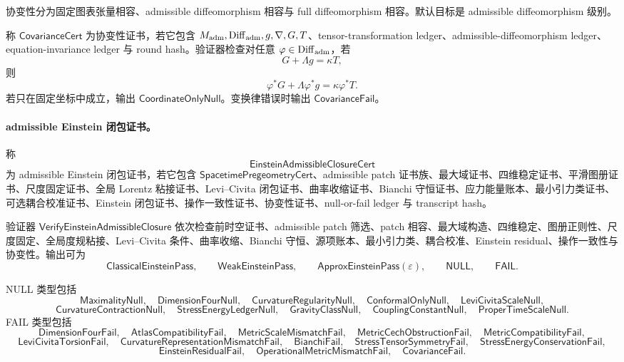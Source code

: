协变性分为固定图表张量相容、admissible diffeomorphism 相容与 full diffeomorphism 相容。默认目标是 admissible diffeomorphism 级别。

\begin{definition}[协变性证书]\label{def:typed-address-biaxial-completion-covariance-cert}
称 \(\mathsf{CovarianceCert}\) 为协变性证书，若它包含 \(M_{\mathrm{adm}},\mathrm{Diff}_{\rm adm},g,\nabla,G,T\)、tensor-transformation ledger、admissible-diffeomorphism ledger、equation-invariance ledger 与 round hash。验证器检查对任意 \(\varphi\in\mathrm{Diff}_{\rm adm}\)，若
\[
G+\Lambda g=\kappa T,
\]
则
\[
\varphi^*G+\Lambda\varphi^*g=\kappa\varphi^*T.
\]
若只在固定坐标中成立，输出 \(\mathsf{CoordinateOnlyNull}\)。变换律错误时输出 \(\mathsf{CovarianceFail}\)。
\end{definition}

\paragraph{admissible Einstein 闭包证书。}
\begin{definition}\label{def:typed-address-biaxial-completion-einstein-admissible-closure-cert}
称
\[
\mathsf{EinsteinAdmissibleClosureCert}
\]
为 admissible Einstein 闭包证书，若它包含 \(\mathsf{SpacetimePregeometryCert}\)、admissible patch 证书族、最大域证书、四维稳定证书、平滑图册证书、尺度固定证书、全局 Lorentz 粘接证书、Levi--Civita 闭包证书、曲率收缩证书、Bianchi 守恒证书、应力能量账本、最小引力类证书、可选耦合校准证书、Einstein 闭包证书、操作一致性证书、协变性证书、null-or-fail ledger 与 transcript hash。
\end{definition}

验证器 \(\mathsf{VerifyEinsteinAdmissibleClosure}\) 依次检查前时空证书、admissible patch 筛选、patch 相容、最大域构造、四维稳定、图册正则性、尺度固定、全局度规粘接、Levi--Civita 条件、曲率收缩、Bianchi 守恒、源项账本、最小引力类、耦合校准、Einstein residual、操作一致性与协变性。输出可为
\[
\mathsf{ClassicalEinsteinPass},\qquad
\mathsf{WeakEinsteinPass},\qquad
\mathsf{ApproxEinsteinPass}(\varepsilon),\qquad
\mathsf{NULL},\qquad
\mathsf{FAIL}.
\]

NULL 类型包括
\[
\mathsf{MaximalityNull},\quad
\mathsf{DimensionFourNull},\quad
\mathsf{CurvatureRegularityNull},\quad
\mathsf{ConformalOnlyNull},\quad
\mathsf{LeviCivitaScaleNull},
\]
\[
\mathsf{CurvatureContractionNull},\quad
\mathsf{StressEnergyLedgerNull},\quad
\mathsf{GravityClassNull},\quad
\mathsf{CouplingConstantNull},\quad
\mathsf{ProperTimeScaleNull}.
\]
FAIL 类型包括
\[
\mathsf{DimensionFourFail},\quad
\mathsf{AtlasCompatibilityFail},\quad
\mathsf{MetricScaleMismatchFail},\quad
\mathsf{MetricCechObstructionFail},\quad
\mathsf{MetricCompatibilityFail},
\]
\[
\mathsf{LeviCivitaTorsionFail},\quad
\mathsf{CurvatureRepresentationMismatchFail},\quad
\mathsf{BianchiFail},\quad
\mathsf{StressTensorSymmetryFail},\quad
\mathsf{StressEnergyConservationFail},
\]
\[
\mathsf{EinsteinResidualFail},\quad
\mathsf{OperationalMetricMismatchFail},\quad
\mathsf{CovarianceFail}.
\]

